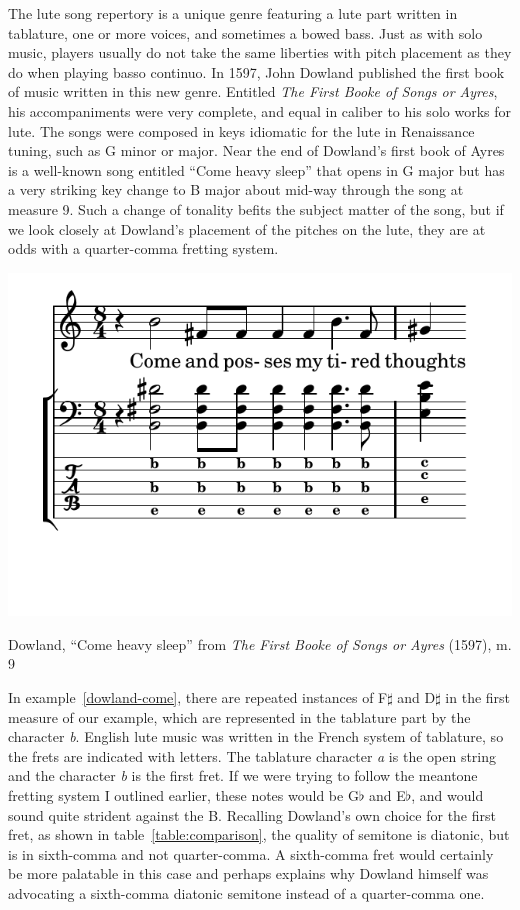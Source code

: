 The lute song repertory is a unique genre featuring a lute part written in tablature, one or more
voices, and sometimes a bowed bass. Just as with solo music, players usually do not take the same
liberties with pitch placement as they do when playing basso continuo. In 1597, John Dowland published the
first book of music written in this new genre. Entitled \textit{The First Booke of Songs or Ayres},
his accompaniments were very complete, and equal in caliber to his solo works for lute. The songs
were composed in keys idiomatic for the lute in Renaissance tuning, such as G minor or major. Near the
end of Dowland's first book of Ayres is a well-known song entitled ``Come heavy sleep'' that opens
in G major but has a very striking key change to B major about mid-way through the song at measure 9.
Such a change of tonality befits the subject matter of the song, but if we look closely at
Dowland's placement of the pitches on the lute, they are at odds with a quarter-comma fretting
system.
\begin{example}[h]
\centering
\includegraphics{examples/come.pdf}
\caption{Dowland, ``Come heavy sleep'' from \textit{The First Booke of Songs or Ayres} (1597), m. 9}
\label{dowland-come}
\end{example}
In example~\ref{dowland-come}, there are repeated instances of F$\sharp$ and D$\sharp$ in the
first measure of our example, which are represented in the tablature part by the character
\textit{b}. English lute music was written in the French system of tablature, so the
frets are indicated with letters. The tablature character \textit{a} is the open
string and the character \textit{b} is the first fret. If we were trying to follow the
meantone fretting system I outlined earlier, these notes would be G$\flat$ and E$\flat$,
and would sound quite strident against the B. Recalling Dowland's own choice for the
first fret, as shown in table~\ref{table:comparison}, the quality of semitone is diatonic,
but is in sixth-comma and not quarter-comma. A sixth-comma fret would certainly be more
palatable in this case and perhaps explains why Dowland himself was advocating a sixth-comma
diatonic semitone instead of a quarter-comma one.

